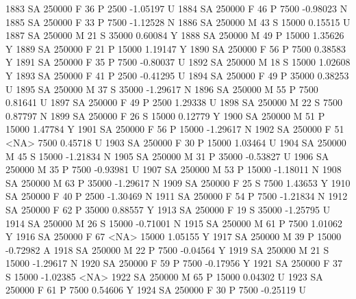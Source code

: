 \documentclass{article}
\begin{document}
\begin{Schunk}
\begin{Soutput}
1883     SA     250000   F  36         P   2500  -1.05197    U
1884     SA     250000   F  46         P   7500  -0.98023    N
1885     SA     250000   F  33         P   7500  -1.12528    N
1886     SA     250000   M  43         S  15000   0.15515    U
1887     SA     250000   M  21         S  35000   0.60084    Y
1888     SA     250000   M  49         P  15000   1.35626    Y
1889     SA     250000   F  21         P  15000   1.19147    Y
1890     SA     250000   F  56         P   7500   0.38583    Y
1891     SA     250000   F  35         P   7500  -0.80037    U
1892     SA     250000   M  18         S  15000   1.02608    Y
1893     SA     250000   F  41         P   2500  -0.41295    U
1894     SA     250000   F  49         P  35000   0.38253    U
1895     SA     250000   M  37         S  35000  -1.29617    N
1896     SA     250000   M  55         P   7500   0.81641    U
1897     SA     250000   F  49         P   2500   1.29338    U
1898     SA     250000   M  22         S   7500   0.87797    N
1899     SA     250000   F  26         S  15000   0.12779    Y
1900     SA     250000   M  51         P  15000   1.47784    Y
1901     SA     250000   F  56         P  15000  -1.29617    N
1902     SA     250000   F  51      <NA>   7500   0.45718    U
1903     SA     250000   F  30         P  15000   1.03464    U
1904     SA     250000   M  45         S  15000  -1.21834    N
1905     SA     250000   M  31         P  35000  -0.53827    U
1906     SA     250000   M  35         P   7500  -0.93981    U
1907     SA     250000   M  53         P  15000  -1.18011    N
1908     SA     250000   M  63         P  35000  -1.29617    N
1909     SA     250000   F  25         S   7500   1.43653    Y
1910     SA     250000   F  40         P   2500  -1.30469    N
1911     SA     250000   F  54         P   7500  -1.21834    N
1912     SA     250000   F  62         P  35000   0.88557    Y
1913     SA     250000   F  19         S  35000  -1.25795    U
1914     SA     250000   M  26         S  15000  -0.71001    N
1915     SA     250000   M  61         P   7500   1.01062    Y
1916     SA     250000   F  67      <NA>  15000   1.05155    Y
1917     SA     250000   M  39         P  15000  -0.72982    A
1918     SA     250000   M  22         P   7500  -0.04564    Y
1919     SA     250000   M  21         S  15000  -1.29617    N
1920     SA     250000   F  59         P   7500  -0.17956    Y
1921     SA     250000   F  37         S  15000  -1.02385 <NA>
1922     SA     250000   M  65         P  15000   0.04302    U
1923     SA     250000   F  61         P   7500   0.54606    Y
1924     SA     250000   F  30         P   7500  -0.25119    U

\end{Soutput}
\end{Schunk}
\end{document}
